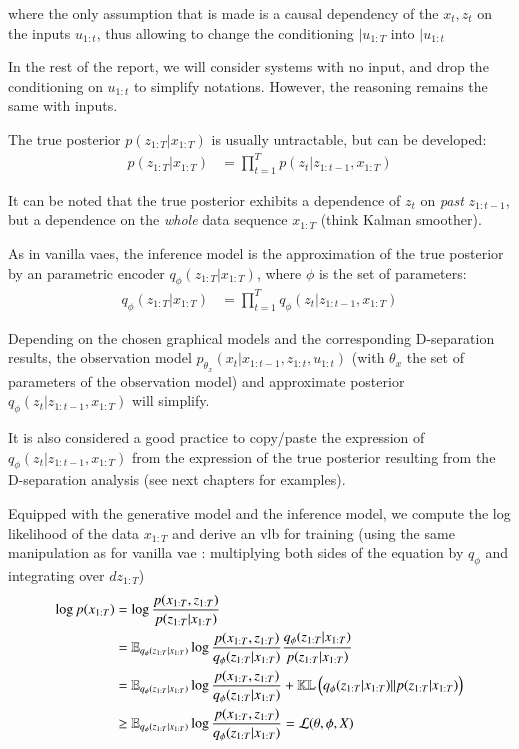 where the only assumption that is made is a causal dependency of the $x_t, z_t$ on the inputs $u_{1:t}$, thus allowing to change the conditioning $\vert u_{1:T}$ into $\vert u_{1:t}$

In the rest of the report, we will consider systems with no input, and drop the conditioning on $u_{1:t}$ to simplify notations. However, the reasoning remains the same with inputs.

The true posterior  $p(z_{1:T} \vert x_{1:T})$ is usually untractable, but can be developed:
\begin{align*}
    p(z_{1:T} \vert x_{1:T}) &= \prod_{t=1}^T p(z_t \vert z_{1:t-1}, x_{1:T})
\end{align*}

It can be noted that the true posterior exhibits a dependence of $z_t$ on \textit{past} $z_{1:t-1}$, but a dependence on the \textit{whole} data sequence $x_{1:T}$ (think Kalman smoother).

As in vanilla \glspl{vae}, the inference model is the approximation of the true posterior by an parametric encoder $q_{\phi}(z_{1:T} \vert x_{1:T})$, where $\phi$ is the set of parameters:
\begin{align*}
    q_{\phi}(z_{1:T} \vert x_{1:T}) &= \prod_{t=1}^T q_\phi(z_t \vert z_{1:t-1}, x_{1:T})
\end{align*}

Depending on the chosen graphical models and the corresponding D-separation results, the observation model $p_{\theta_x}(x_t \vert x_{1:t-1}, z_{1:t}, u_{1:t})$ (with $\theta_x$ the set of parameters of the observation model) and approximate posterior $q_\phi(z_t \vert z_{1:t-1}, x_{1:T})$ will simplify. 

It is also considered a good practice to copy/paste the expression of $q_\phi(z_t \vert z_{1:t-1}, x_{1:T})$ from the expression of the true posterior resulting from the D-separation analysis (see next chapters for examples).

Equipped with the generative model and the inference model, we compute the log likelihood of the data $x_{1:T}$ and derive an \gls{vlb} for training (using the same manipulation as for vanilla \gls{vae} : multiplying both sides of the equation by $q_\phi$ and integrating over $dz_{1:T}$)
\begin{align}
    \log{p(x_{1:T})} &= \log{\frac{p(x_{1:T}, z_{1:T})}{p(z_{1:T} \vert x_{1:T})}} \\
    &= \mathbb{E}_{q_{\phi}(z_{1:T}\vert x_{1:T})} \log{\frac{p(x_{1:T}, z_{1:T})}{q_{\phi}(z_{1:T}\vert x_{1:T})} \frac{q_{\phi}(z_{1:T}\vert x_{1:T})}{p(z_{1:T} \vert x_{1:T})}} \\
    &= \mathbb{E}_{q_{\phi}(z_{1:T}\vert x_{1:T})} \log{\frac{p(x_{1:T}, z_{1:T})}{q_{\phi}(z_{1:T}\vert x_{1:T})} + \mathbb{KL}\left( q_{\phi}(z_{1:T}\vert x_{1:T}) \vert\vert p(z_{1:T} \vert x_{1:T}) \right)} \\
    &\geq \mathbb{E}_{q_{\phi}(z_{1:T}\vert x_{1:T})} \log{\frac{p(x_{1:T}, z_{1:T})}{q_{\phi}(z_{1:T}\vert x_{1:T})}} = \mathcal{L}(\theta, \phi, X)
\end{align}

